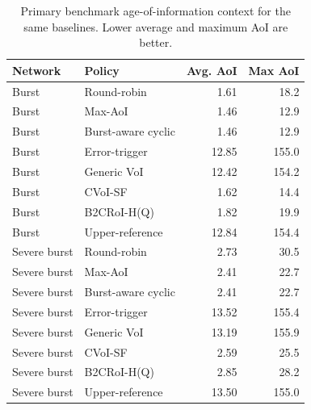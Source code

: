 \begin{table}[t]
\centering
\caption{Primary benchmark age-of-information context for the same baselines. Lower average and maximum AoI are better.}
\label{tab:standard_baselines_aoi}
\begin{tabular}{llrr}
\hline
Network & Policy & Avg. AoI & Max AoI \\
\hline
Burst & Round-robin & 1.61 & 18.2 \\
Burst & Max-AoI & 1.46 & 12.9 \\
Burst & Burst-aware cyclic & 1.46 & 12.9 \\
Burst & Error-trigger & 12.85 & 155.0 \\
Burst & Generic VoI & 12.42 & 154.2 \\
Burst & CVoI-SF & 1.62 & 14.4 \\
Burst & B2CRoI-H(Q) & 1.82 & 19.9 \\
Burst & Upper-reference & 12.84 & 154.4 \\
\hline
Severe burst & Round-robin & 2.73 & 30.5 \\
Severe burst & Max-AoI & 2.41 & 22.7 \\
Severe burst & Burst-aware cyclic & 2.41 & 22.7 \\
Severe burst & Error-trigger & 13.52 & 155.4 \\
Severe burst & Generic VoI & 13.19 & 155.9 \\
Severe burst & CVoI-SF & 2.59 & 25.5 \\
Severe burst & B2CRoI-H(Q) & 2.85 & 28.2 \\
Severe burst & Upper-reference & 13.50 & 155.0 \\
\hline
\end{tabular}
\end{table}
